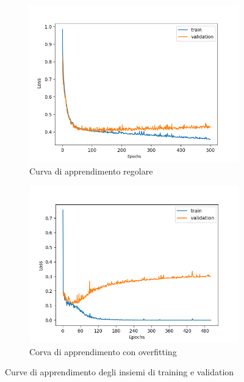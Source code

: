 \documentclass[12pt, twoside, letterpaper]{report}
\begin{document}
				\begin{figure}[h]
				\begin{subfigure}[]{.5\textwidth}
					\centering
					\includegraphics[width=\linewidth]{learning_curve.png}
					\caption{Curva di apprendimento regolare}
					\label{fig:learning_curve}
				\end{subfigure}
				\hfill
				\begin{subfigure}[]{.5\textwidth}
					\centering
					\includegraphics[width=\linewidth]{overfitting.png}
					\caption{Corva di apprendimento con overfitting}
					\label{fig:overfitting}
				\end{subfigure}
				
				\caption{Curve di apprendimento degli insiemi di training e validation}
				\label{fig:curve_di_apprendimento}
				\end{figure}
				
\end{document}
